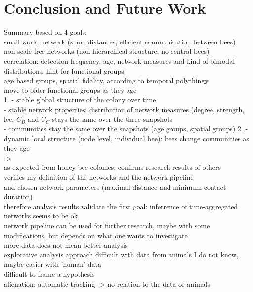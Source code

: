 \chapter{Conclusion and Future Work}
\label{ch:conclusion}

Summary based on 4 goals:\\
small world network (short distances, efficient communication between bees)\\
non-scale free networks (non hierarchical structure, no central bees)\\
correlation: detection frequency, age, network measures and kind of bimodal distributions, hint for functional groups\\
age based groups, spatial fidality, according to temporal polythingy\\
move to older functional groups as they age\\

1. - stable global structure of the colony over time\\
- stable network properties: distribution of network measures (degree, strength, lcc, $C_B$ and $C_C$ stays the same over the three snapshots\\
- communities stay the same over the snapshots (age groups, spatial groups)
2. - dynamic local structure (node level, individual bee): bees change communities as they age\\
->\\
as expected from honey bee colonies, confirms research results of others\\
verifies my definition of the networks and the network pipeline\\
and chosen network parameters (maximal distance and minimum contact duration)\\
therefore analysis results validate the first goal: inferrence of time-aggregated networks seems to be ok\\

network pipeline can be used for further research, maybe with some modifications, but depends on what one wants to investigate\\

more data does not mean better analysis\\
explorative analysis approach difficult with data from animals I do not know, maybe easier with 'human' data\\
difficult to frame a hypothesis\\
alienation: automatic tracking -> no relation to the data or animals\\

